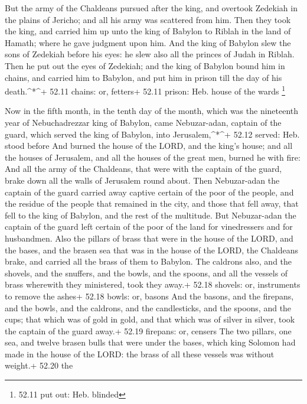  But the army of the Chaldeans pursued after the king, and
overtook Zedekiah in the plains of Jericho; and all his army was
scattered from him.  Then they took the king, and carried
him up unto the king of Babylon to Riblah in the land of Hamath; where
he gave judgment upon him.  And the king of Babylon slew
the sons of Zedekiah before his eyes: he slew also all the princes of
Judah in Riblah.  Then he put out the eyes of Zedekiah; and
the king of Babylon bound him in chains, and carried him to Babylon, and
put him in prison till the day of his death.\^{}*\^{}+ 52.11 chains: or,
fetters+ 52.11 prison: Heb. house of the wards \footnote{52.11 put out:
  Heb. blinded}

 Now in the fifth month, in the tenth day of the month,
which was the nineteenth year of Nebuchadrezzar king of Babylon, came
Nebuzar-adan, captain of the guard, which served the king of Babylon,
into Jerusalem,\^{}*\^{}+ 52.12 served: Heb. stood before 
And burned the house of the LORD, and the king's house; and all the
houses of Jerusalem, and all the houses of the great men, burned he with
fire:  And all the army of the Chaldeans, that were with
the captain of the guard, brake down all the walls of Jerusalem round
about.  Then Nebuzar-adan the captain of the guard carried
away captive certain of the poor of the people, and the residue of the
people that remained in the city, and those that fell away, that fell to
the king of Babylon, and the rest of the multitude.  But
Nebuzar-adan the captain of the guard left certain of the poor of the
land for vinedressers and for husbandmen.  Also the pillars
of brass that were in the house of the LORD, and the bases, and the
brasen sea that was in the house of the LORD, the Chaldeans brake, and
carried all the brass of them to Babylon.  The caldrons
also, and the shovels, and the snuffers, and the bowls, and the spoons,
and all the vessels of brass wherewith they ministered, took they away.+
52.18 shovels: or, instruments to remove the ashes+ 52.18 bowls: or,
basons  And the basons, and the firepans, and the bowls,
and the caldrons, and the candlesticks, and the spoons, and the cups;
that which was of gold in gold, and that which was of silver in silver,
took the captain of the guard away.+ 52.19 firepans: or, censers
 The two pillars, one sea, and twelve brasen bulls that
were under the bases, which king Solomon had made in the house of the
LORD: the brass of all these vessels was without weight.+ 52.20 the
